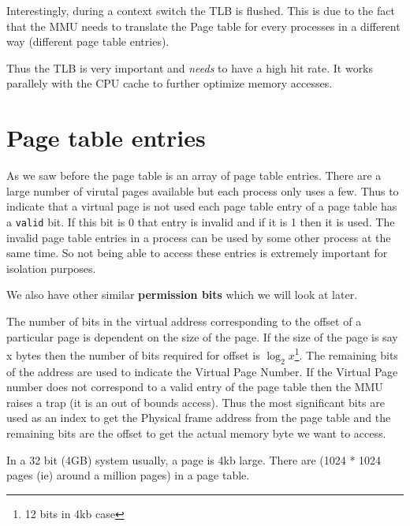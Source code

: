\documentclass[12pt]{article}
\newcommand{\tbox}[1]{\noindent\fbox{\parbox{\textwidth}{#1}}}
\begin{document}
Interestingly, during a context switch the TLB is flushed. This is due to the fact that the MMU needs to translate the Page table for every processes in a different
way (different page table entries).


Thus the TLB is very important and \textit{needs} to have a high hit rate. It works 
parallely with the CPU cache to further optimize memory accesses.  
\\

\newpage
\noindent\tbox{
    \begin{center}
    \textbf{\Huge Lecture 14}\\
    \end{center}
}

\section*{Page table entries}
As we saw before the page table is an array of page table entries. 
There are a large number of virutal pages available but each process only uses a few. Thus to indicate that
a virtual page is not used each page table entry of a page table has a \texttt{valid} bit. If this bit is 0 that entry is invalid and if it is 1 then it is used. 
The invalid page table entries in a process can be used by some other process at the same time. So not being able to access these entries is extremely important for isolation purposes.

We also have other similar \textbf{permission bits} which we will look at later.

The number of bits in the virtual address corresponding to the offset of a particular page is dependent on the size of the page. 
If the size of the page is say x bytes then the number of bits required for offset is \(\log_{2} x\)\footnote{12 bits in 4kb case}. The remaining bits of the address are used to indicate the 
Virtual Page Number. If the Virtual Page number does not correspond to a valid entry of the page table then the MMU raises a trap (it is an out of bounds access). Thus the most significant bits are used as an index to get the Physical frame address from the 
page table and the remaining bits are the offset to get the actual memory byte we want to access. 

In a 32 bit (4GB) system usually, a page is 4kb large. There are (1024 * 1024 pages (ie) around a million pages) in a page table.
\end{document}
